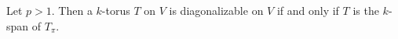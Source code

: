 Let $p > 1$. Then a $k$-torus $T$ on $V$ is diagonalizable on $V$ if and only if $T$ is the $k$-span of $T_\pi$.
